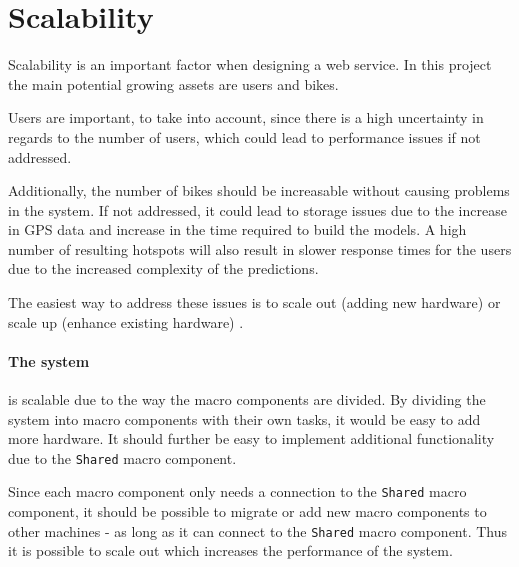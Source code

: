 \section{Scalability}
Scalability is an important factor when designing a web service. In this project the main potential growing assets are users and bikes.

Users are important, to take into account, since there is a high uncertainty in regards to the number of users, which could lead to performance issues if not addressed.

Additionally, the number of bikes should be increasable without causing problems in the system. If not addressed, it could lead to storage issues due to the increase in GPS data and increase in the time required to build the models.
A high number of resulting hotspots will also result in slower response times for the users due to the increased complexity of the predictions.

The easiest way to address these issues is to scale out (adding new hardware) or scale up (enhance existing hardware) \cite{michael2007scale}. 

\paragraph{The system} is scalable due to the way the macro components are divided. By dividing the system into macro components with their own tasks, it would be easy to add more hardware. It should further be easy to implement additional functionality due to the \texttt{Shared} macro component.

Since each macro component only needs a connection to the \texttt{Shared} macro component, it should be possible to migrate or add new macro components to other machines - as long as it can connect to the \texttt{Shared} macro component. Thus it is possible to scale out which increases the performance of the system.